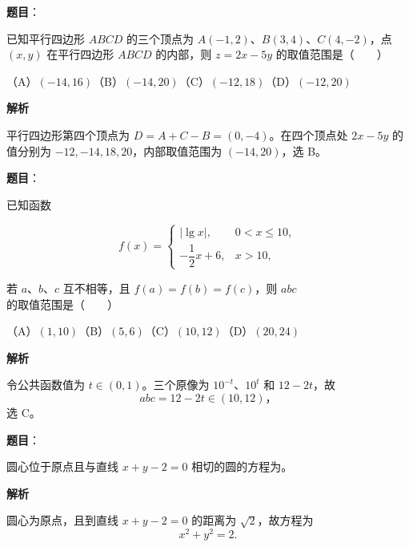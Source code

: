 \begin{answer}

\textbf{题目}：

已知平行四边形 $ABCD$ 的三个顶点为 $A(-1,2)\text{、}B(3,4)\text{、}C(4,-2)$，点 $(x,y)$ 在平行四边形 $ABCD$ 的内部，则 $z=2x-5y$ 的取值范围是\mbox{（　　）}

（A）$(-14,16)$\quad（B）$(-14,20)$\quad（C）$(-12,18)$\quad（D）$(-12,20)$

\textbf{解析}

平行四边形第四个顶点为 $D=A+C-B=(0,-4)$。在四个顶点处
$2x-5y$ 的值分别为 $-12,-14,18,20$，内部取值范围为 $(-14,20)$，选 B。


\end{answer}
\begin{answer}

\textbf{题目}：

已知函数

\nopagebreak[4]
\[
f(x)=\begin{cases}|\lg x|,&0<x\leq10,\\-\dfrac12x+6,&x>10,\end{cases}
\]

若 $a\text{、}b\text{、}c$ 互不相等，且 $f(a)=f(b)=f(c)$，则 $abc$ 的取值范围是\mbox{（　　）}

（A）$(1,10)$\quad（B）$(5,6)$\quad（C）$(10,12)$\quad（D）$(20,24)$

\textbf{解析}

令公共函数值为 $t\in(0,1)$。三个原像为 $10^{-t}$、$10^t$ 和
$12-2t$，故
\nopagebreak[4]
\[
abc=12-2t\in(10,12)\text{，}
\]
选 C。


\end{answer}
\begin{answer}

\textbf{题目}：

圆心位于原点且与直线 $x+y-2=0$ 相切的圆的方程为\gkblank{}。

\textbf{解析}

圆心为原点，且到直线 $x+y-2=0$ 的距离为 $\sqrt2$，故方程为
\nopagebreak[4]
\[x^2+y^2=2.\]


\end{answer}
